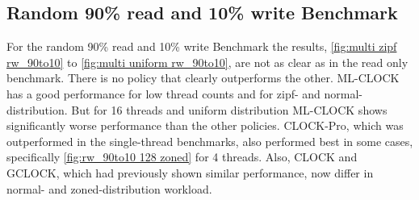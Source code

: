 \documentclass[
	12pt,
	a4paper,
	abstract,
	bibliography=totoc,
	chapterprefix,
	headings=openright,
	numbers=endperiod,
	parskip=half,
	twoside,
]{scrreprt}
\begin{document}
\subsection{Random 90\% read and 10\% write Benchmark}

For the random 90\% read and 10\% write Benchmark the results, 
\cref{fig:multi zipf rw_90to10} to \cref{fig:multi uniform rw_90to10}, 
are not as clear as in the read only benchmark.
There is no policy that clearly outperforms the other.
ML-CLOCK has a good performance for low thread counts and for zipf- and normal-distribution.
But for 16 threads and uniform distribution ML-CLOCK shows significantly worse performance than the other policies.
CLOCK-Pro, which was outperformed in the single-thread benchmarks, also performed best in some cases, specifically \cref{fig:rw_90to10 128 zoned} for 4 threads.
Also, CLOCK and GCLOCK, which had previously shown similar performance, 
now differ in normal- and zoned-distribution workload.
\end{document}
